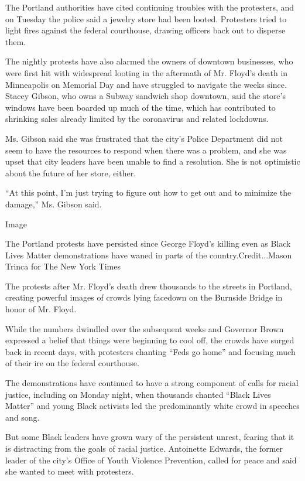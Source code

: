The Portland authorities have cited continuing troubles with the
protesters, and on Tuesday the police said a jewelry store had been
looted. Protesters tried to light fires against the federal courthouse,
drawing officers back out to disperse them.

The nightly protests have also alarmed the owners of downtown
businesses, who were first hit with widespread looting in the aftermath
of Mr. Floyd's death in Minneapolis on Memorial Day and have struggled
to navigate the weeks since. Stacey Gibson, who owns a Subway sandwich
shop downtown, said the store's windows have been boarded up much of the
time, which has contributed to shrinking sales already limited by the
coronavirus and related lockdowns.

Ms. Gibson said she was frustrated that the city's Police Department did
not seem to have the resources to respond when there was a problem, and
she was upset that city leaders have been unable to find a resolution.
She is not optimistic about the future of her store, either.

``At this point, I'm just trying to figure out how to get out and to
minimize the damage,'' Ms. Gibson said.

Image

The Portland protests have persisted since George Floyd's killing even
as Black Lives Matter demonstrations have waned in parts of the
country.Credit...Mason Trinca for The New York Times

The protests after Mr. Floyd's death drew thousands to the streets in
Portland, creating powerful images of crowds lying facedown on the
Burnside Bridge in honor of Mr. Floyd.

While the numbers dwindled over the subsequent weeks and Governor Brown
expressed a belief that things were beginning to cool off, the crowds
have surged back in recent days, with protesters chanting ``Feds go
home'' and focusing much of their ire on the federal courthouse.

The demonstrations have continued to have a strong component of calls
for racial justice, including on Monday night, when thousands chanted
``Black Lives Matter'' and young Black activists led the predominantly
white crowd in speeches and song.

But some Black leaders have grown wary of the persistent unrest, fearing
that it is distracting from the goals of racial justice. Antoinette
Edwards, the former leader of the city's Office of Youth Violence
Prevention, called for peace and said she wanted to meet with
protesters.

